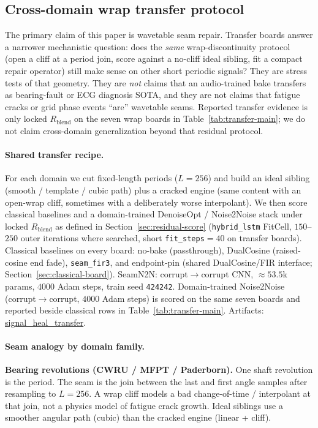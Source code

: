 
\subsection{Cross-domain wrap transfer protocol}
\label{sec:transfer-protocol}

The primary claim of this paper is wavetable seam repair.
Transfer boards answer a narrower mechanistic question:
does the \emph{same} wrap-discontinuity protocol (open a cliff at a period join, score against a no-cliff ideal sibling, fit a compact repair operator) still make sense on other short periodic signals?
They are stress tests of that geometry.
They are \emph{not} claims that an audio-trained bake transfers as bearing-fault or ECG diagnosis SOTA,
and they are not claims that fatigue cracks or grid phase events ``are'' wavetable seams.
Reported transfer evidence is only locked $R_{\mathrm{blend}}$ on the seven wrap boards in Table~\ref{tab:transfer-main}; we do not claim cross-domain generalization beyond that residual protocol.

\paragraph{Shared transfer recipe.}
For each domain we cut fixed-length periods ($L{=}256$) and build an ideal sibling (smooth / template / cubic path) plus a cracked engine (same content with an open-wrap cliff, sometimes with a deliberately worse interpolant).
We then score classical baselines and a domain-trained DenoiseOpt / Noise2Noise stack under locked $R_{\mathrm{blend}}$ as defined in Section~\ref{sec:residual-score}
(\texttt{hybrid\_lstm} FitCell, $150$--$250$ outer iterations where searched, short \texttt{fit\_steps}${}={}40$ on transfer boards).
Classical baselines on every board: no-bake (passthrough), DualCosine (raised-cosine end fade), \texttt{seam\_fir3}, and endpoint-pin (shared DualCosine/FIR interface; Section~\ref{sec:classical-board}).
SeamN2N: corrupt$\to$corrupt CNN, ${\approx}53.5$k params, $4000$ Adam steps, train seed \texttt{424242}.
Domain-trained Noise2Noise (corrupt$\to$corrupt, $4000$ Adam steps) is scored on the same seven boards and reported beside classical rows in Table~\ref{tab:transfer-main}.
Artifacts:
\href{https://github.com/reeldemo/reelsynth/tree/main/brand/artifacts/signal_heal_transfer}{signal\_heal\_transfer}.

\paragraph{Seam analogy by domain family.}
\textbf{Bearing revolutions (CWRU / MFPT / Paderborn).}
One shaft revolution is the period.
The seam is the join between the last and first angle samples after resampling to $L{=}256$.
A wrap cliff models a bad change-of-time / interpolant at that join, not a physics model of fatigue crack growth.
Ideal siblings use a smoother angular path (cubic) than the cracked engine (linear + cliff).

